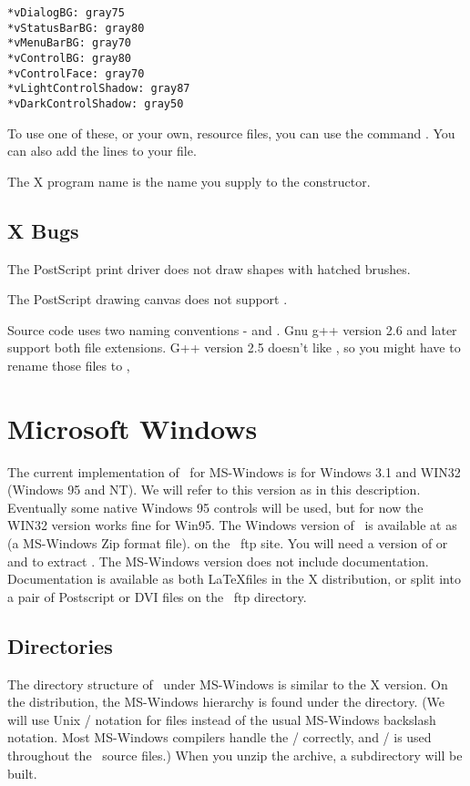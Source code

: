 \begin{verbatim}
*vDialogBG: gray75
*vStatusBarBG: gray80
*vMenuBarBG: gray70
*vControlBG: gray80
*vControlFace: gray70
*vLightControlShadow: gray87
*vDarkControlShadow: gray50
\end{verbatim}

To use one of these, or your own, resource files, you can
use the command . You
can also add the lines to your  file.

The X program name is the name you supply to the  constructor.

\subsection* {X Bugs}

The PostScript print driver does not draw shapes with hatched
brushes.

The PostScript drawing canvas does not support .

Source code uses two naming conventions -  and
. Gnu g++ version 2.6 and later support both
file extensions. G++ version 2.5 doesn't like ,
so you might have to rename those files to ,

\section{Microsoft Windows}

The current implementation of \V\ for MS-Windows is for Windows 3.1
and WIN32 (Windows 95 and NT). We will refer to this version as  in this
description. Eventually some native Windows 95 controls will
be used, but for now the WIN32 version works fine for Win95.
The Windows version of \V\ is available at as 
 (a MS-Windows Zip format file). on the \V\ ftp
site. You will need a version of  or  and
 to extract \V. The MS-Windows version does not include
documentation. Documentation is available as both \LaTeX files in
the X distribution, or split into a pair of Postscript or
DVI files on the \V\ ftp directory.

\subsection* {Directories}

The directory structure of \V\ under MS-Windows is similar to the X version.
On the distribution, the MS-Windows hierarchy is found under the 
directory. (We will use Unix / notation for files instead of the
usual MS-Windows backslash notation. Most MS-Windows compilers handle
the / correctly, and / is used throughout the \V\ source files.)
When you unzip the archive, a subdirectory  will be
built.


